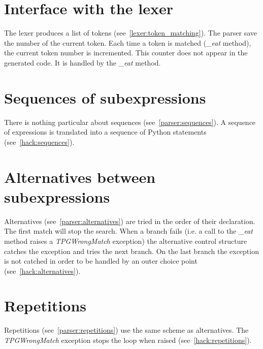 \section{Interface with the lexer}

The lexer produces a list of tokens (see~\ref{lexer:token_matching}).
The parser save the number of the current token.
Each time a token is matched (\emph{\_eat} method), the current token number is incremented.
This counter does not appear in the generated code. It is handled by the \emph{\_eat} method.

\section{Sequences of subexpressions}

There is nothing particular about sequences (see~\ref{parser:sequences}).
A sequence of expressions is translated into a sequence of Python statements (see~\ref{hack:sequences}).

\section{Alternatives between subexpressions}

Alternatives (see~\ref{parser:alternatives}) are tried in the order of their declaration.
The first match will stop the search.
When a branch fails (i.e. a call to the \emph{\_eat} method raises a \emph{TPGWrongMatch} exception)
the alternative control structure catches the exception and tries the next branch.
On the last branch the exception is not catched in order to be handled by an outer choice point
(see~\ref{hack:alternatives}).

\section{Repetitions}

Repetitions (see~\ref{parser:repetitions}) use the same scheme as alternatives.
The \emph{TPGWrongMatch} exception stops the loop when raised
(see~\ref{hack:repetitions}).

